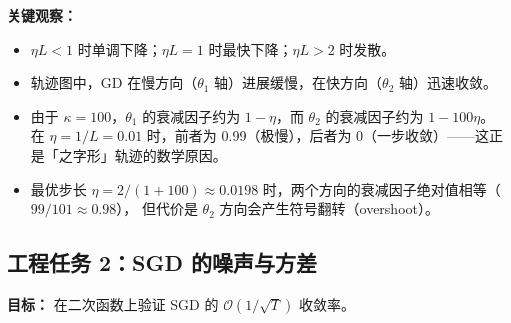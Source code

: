 \documentclass[12pt,a4paper]{ctexart}
\theoremstyle{definition}
\theoremstyle{plain}
\begin{document}
\textbf{关键观察：}

\begin{itemize}
  \item $\eta L < 1$ 时单调下降；$\eta L = 1$ 时最快下降；$\eta L > 2$ 时发散。
  \item 轨迹图中，GD 在慢方向（$\theta_1$ 轴）进展缓慢，在快方向（$\theta_2$ 轴）迅速收敛。
  \item 由于 $\kappa=100$，$\theta_1$ 的衰减因子约为 $1 - \eta$，而 $\theta_2$ 的衰减因子约为 $1 - 100\eta$。
    在 $\eta = 1/L = 0.01$ 时，前者为 0.99（极慢），后者为 0（一步收敛）——这正是「之字形」轨迹的数学原因。
  \item 最优步长 $\eta = 2/(1+100) \approx 0.0198$ 时，两个方向的衰减因子绝对值相等（$99/101 \approx 0.98$），
    但代价是 $\theta_2$ 方向会产生符号翻转（overshoot）。
\end{itemize}

\subsection{工程任务 2：SGD 的噪声与方差}

\noindent\textbf{目标：} 在二次函数上验证 SGD 的 $\mathcal{O}(1/\sqrt{T})$ 收敛率。
\end{document}

